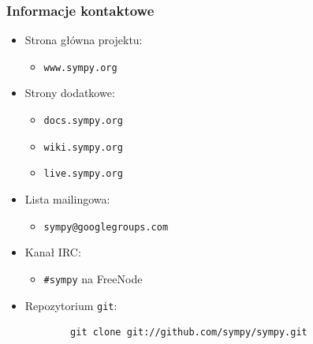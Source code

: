 \documentclass[10pt]{beamer}
\begin{document}
\begin{frame}[fragile]
    \frametitle{Informacje kontaktowe}

    \begin{itemize}
        \item Strona główna projektu:
            \begin{itemize}
                \item \texttt{www.sympy.org}
            \end{itemize}
        \item Strony dodatkowe:
            \begin{itemize}
                \item \texttt{docs.sympy.org}
                \item \texttt{wiki.sympy.org}
                \item \texttt{live.sympy.org}
            \end{itemize}
        \item Lista mailingowa:
            \begin{itemize}
                \item \texttt{sympy@googlegroups.com}
            \end{itemize}
        \item Kanał IRC:
            \begin{itemize}
                \item \texttt{\#sympy} na FreeNode
            \end{itemize}
        \item Repozytorium \texttt{git}:
        \begin{verbatim}
        git clone git://github.com/sympy/sympy.git
        \end{verbatim}
    \end{itemize}
\end{frame}
\end{document}

